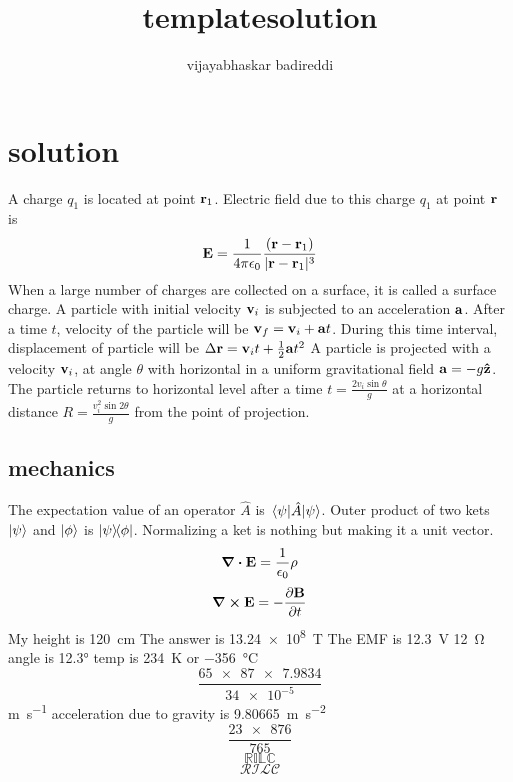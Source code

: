 \documentclass[12pt] {article}
\title{templatesolution}
\author{vijayabhaskar badireddi}
\begin{document}
\section*{solution}
A charge $q_1$ is located at point $\vb{r}_1$.
Electric field due to this charge $q_1$ at point $\vb{r}$ is
\[\vb{E}=\frac{1}{4\pi\epsilon_0}\frac{(\vb{r}-\vb{r}_1)}{|\vb{r}-\vb{r}_1|^3}\]
When a large number of charges are collected on a surface, it is called a surface charge.
A particle with initial velocity $\vb{v}_i$ is subjected to an acceleration $\vb{a}$.
After a time $t$, velocity of the particle will be $\vb{v}_f=\vb{v}_i+\vb{a}t$.
During this time interval, displacement of particle will be $\Delta{\vb{r}}=\vb{v}_it+\frac{1}{2}\vb{a}t^2$
A particle is projected with a velocity $\vb{v}_i$, at angle $\theta$ with
 horizontal in a uniform gravitational field $\vb{a}=-g\vu{z}$. The particle returns to
 horizontal level after a time $t=\frac{2v_i\sin\theta}{g}$ at a horizontal distance
  $R=\frac{v_i^2\sin2\theta}{g}$ from the point of projection.
\subsection*{mechanics}
The expectation value of an operator $\hat{A}$ is $\expval{\hat{A}}{\psi}$. Outer product
of two kets $\ket{\psi}$ and $\ket{\phi}$ is $\op{\psi}{\phi}$.
Normalizing a ket is nothing but making it a unit vector.
\[\div{\vb{E}}=\frac{1}{\epsilon_0}\rho\]
\[\curl{\vb{E}}=-\pdv{\vb{B}}{t}\]
My height is \SI{120}{\centi\metre}
The answer is \SI{13.24e8}{\tesla}
The EMF is \SI{12.3}{\volt}
\SI{12}{\ohm}\\
angle is \ang{12.3}
temp is \SI{234}{\kelvin} or \SI{-356}{\celsius}
\[\frac{\num{65 x 87 x 7.9834}}{\num{34e-5}}\]
\si{\meter\per\second}
acceleration due to gravity is \SI{9.80665}{\meter\per\square\second}
\[\frac{\num{23 x 876}}{\num{765}}\]
\[\mathbb{RILC}\]
\[\mathcal{RILC}\]
\end{document}
